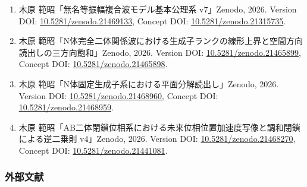 \documentclass[
  a4paper,
]{ltjsarticle}
\providecommand{\tightlist}{%
  \setlength{\itemsep}{0pt}\setlength{\parskip}{0pt}}
\begin{document}
\begin{enumerate}
\def\labelenumi{\arabic{enumi}.}
\tightlist
\item
  木原 範昭「無名等振幅複合波モデル基本公理系 v7」Zenodo, 2026. Version
  DOI:
  \href{https://doi.org/10.5281/zenodo.21469133}{10.5281/zenodo.21469133},
  Concept DOI:
  \href{https://doi.org/10.5281/zenodo.21315735}{10.5281/zenodo.21315735}.
\item
  木原
  範昭「N体完全二体関係波における生成子ランクの線形上界と空間方向読出しの三方向飽和」Zenodo,
  2026. Version DOI:
  \href{https://doi.org/10.5281/zenodo.21465899}{10.5281/zenodo.21465899},
  Concept DOI:
  \href{https://doi.org/10.5281/zenodo.21465898}{10.5281/zenodo.21465898}.
\item
  木原 範昭「N体固定生成子系における平面分解読出し」Zenodo, 2026.
  Version DOI:
  \href{https://doi.org/10.5281/zenodo.21468960}{10.5281/zenodo.21468960},
  Concept DOI:
  \href{https://doi.org/10.5281/zenodo.21468959}{10.5281/zenodo.21468959}.
\item
  木原
  範昭「AB二体閉鎖位相系における未来位相位置加速度写像と調和閉鎖による逆二乗則
  v4」Zenodo, 2026. Version DOI:
  \href{https://doi.org/10.5281/zenodo.21468270}{10.5281/zenodo.21468270},
  Concept DOI:
  \href{https://doi.org/10.5281/zenodo.21441081}{10.5281/zenodo.21441081}.
\end{enumerate}

\subsubsection{外部文献}\label{ux5916ux90e8ux6587ux732e}
\end{document}
